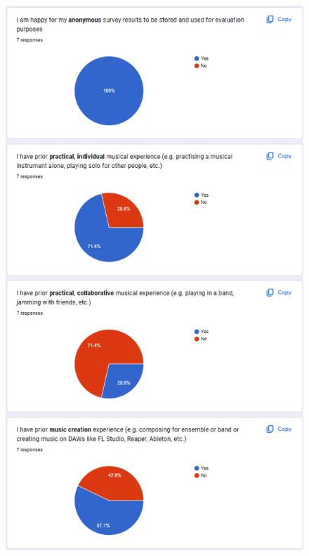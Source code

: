 \begin{appendices}
\begin{figure}[htb]
    \includegraphics[width=0.8\linewidth]{images/survey-results/2.png}    
\end{figure}
\begin{figure}[htb]
    \centering

\end{figure}
\end{appendices}
